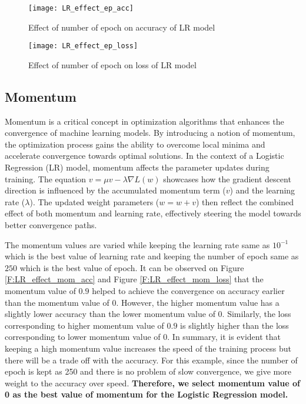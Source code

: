 \documentclass[12pt, a4paper, twoside]{article}
\begin{document}
\begin{figure}[h!]
	\centering
	\texttt{[image: LR\_effect\_ep\_acc]}
	\caption{Effect of number of epoch on  accuracy of LR model}
	\label{F:LR_effect_ep_acc}
\end{figure}
\begin{figure}[h!]
	\centering
	\texttt{[image: LR\_effect\_ep\_loss]}
	\caption{Effect of number of epoch on loss of LR model}
	\label{F:LR_effect_ep_loss}
\end{figure}

\subsection{Momentum}\label{SS:lr-mom}
Momentum is a critical concept in optimization algorithms that enhances the convergence of machine learning models. By introducing a notion of momentum, the optimization process gains the ability to overcome local minima and accelerate convergence towards optimal solutions. In the context of a Logistic Regression (LR) model, momentum affects the parameter updates during training. The equation $v = \mu v - \lambda \nabla L(w)$ showcases how the gradient descent direction is influenced by the accumulated momentum term ($v$) and the learning rate ($\lambda$). The updated weight parameters ($w = w + v$) then reflect the combined effect of both momentum and learning rate, effectively steering the model towards better convergence paths.
\par
The momentum values are varied while keeping the learning rate same as $10^{-1}$ which is the best value of learning rate and keeping the number of epoch same as $250$ which is the best value of epoch. It can be observed on Figure \ref{F:LR_effect_mom_acc} and Figure \ref{F:LR_effect_mom_loss} that the momentum value of $0.9$ helped to achieve the convergence on accuracy earlier than the momentum value of 0. However, the higher momentum value has a slightly lower accuracy than the lower momentum value of 0. Similarly, the loss corresponding to higher momentum value of $0.9$ is slightly higher than the loss corresponding to lower momentum value of 0. In summary, it is evident that keeping a high momentum value increases the speed of the training process but there will be a trade off with the accuracy. For this example, since the number of epoch is kept as 250 and there is no problem of slow convergence, we give more weight to the accuracy over speed. \textbf{Therefore, we select momentum value of 0 as the best value of momentum for the Logistic Regression model.} 
\end{document}
